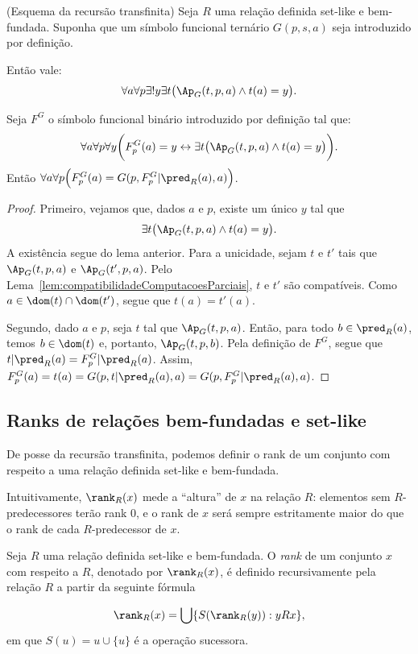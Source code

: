 \begin{theorem}[$\ZFmP$](Esquema da recursão transfinita)\label{thm:esquemaDaRecursaoTransfinita}
    Seja $R$ uma relação definida set-like e bem-fundada.
    Suponha que um símbolo funcional ternário $G(p, s, a)$ seja introduzido por definição.

    Então vale:
    \[
        \forall a \forall p \exists!y \exists t\big(\Ap_G(t, p, a)\wedge t(a)=y\big).
    \]

    Seja $F^G$ o símbolo funcional binário introduzido por definição tal que:
    \[
        \forall a \forall p \forall y\bigg(F^G_{p}(a)=y \leftrightarrow \exists t\big(\Ap_G(t, p, a)\wedge t(a)=y\big)\bigg).
    \]
    Então $\forall a \forall p \Big( F^G_{p}(a)=G(p, F^G_p|\pred_{R}(a), a)\Big)$.
\end{theorem}
\begin{proof}
    Primeiro, vejamos que, dados $a$ e $p$, existe um único $y$ tal que
    \[
        \exists t\big(\Ap_G(t,p,a)\wedge t(a)=y\big).
    \]
    A existência segue do lema anterior.
    Para a unicidade, sejam $t$ e $t'$ tais que $\Ap_G(t,p,a)$ e $\Ap_G(t',p,a)$.
    Pelo Lema~\ref{lem:compatibilidadeComputacoesParciais}, $t$ e $t'$ são compatíveis.
    Como $a\in\dom(t)\cap\dom(t')$, segue que $t(a)=t'(a)$.

    Segundo, dado $a$ e $p$, seja $t$ tal que $\Ap_G(t, p, a)$.
    Então, para todo $b\in \pred_{R}(a)$, temos $b\in \dom(t)$ e, portanto, $\Ap_G(t, p, b)$.
    Pela definição de $F^G$, segue que $t|\pred_{R}(a)=F^G_p|\pred_{R}(a)$.
    Assim, $F^G_p(a)=t(a)=G(p, t|\pred_{R}(a), a)=G(p, F^G_p|\pred_{R}(a), a)$.
\end{proof}

\subsection{Ranks de relações bem-fundadas e set-like}

De posse da recursão transfinita, podemos definir o rank de um conjunto com respeito a uma relação definida set-like e bem-fundada.

Intuitivamente, $\rank_R(x)$ mede a ``altura'' de $x$ na relação $R$: elementos sem $R$-predecessores terão rank $0$, e o rank de $x$ será sempre estritamente maior do que o rank de cada $R$-predecessor de $x$.
\begin{definition}[$\ZFmP$]
    Seja $R$ uma relação definida set-like e bem-fundada.
    O \emph{rank} de um conjunto $x$ com respeito a $R$, denotado por $\rank_R(x)$, é definido recursivamente pela relação $R$ a partir da seguinte fórmula

    \[
        \rank_R(x)=\bigcup\{S(\rank_R(y)): y R x\},
    \]
    em que $S(u)=u\cup\{u\}$ é a operação sucessora.
\end{definition}

